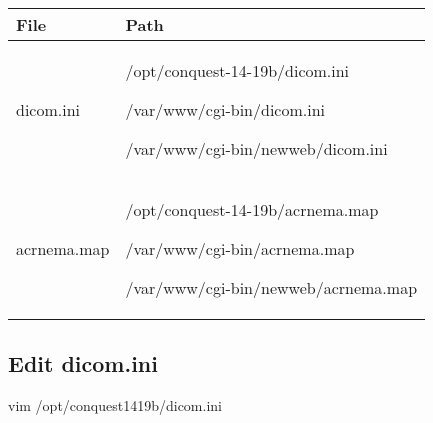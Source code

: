 \documentclass[letterpaper,10pt,english]{sphinxmanual}
\begin{document}
\begin{savenotes}\sphinxattablestart
\centering
\begin{tabulary}{\linewidth}[t]{|T|T|}
\hline
\sphinxstyletheadfamily 
File
&\sphinxstyletheadfamily 
Path
\\
\hline
dicom.ini
&
/opt/conquest-14-19b/dicom.ini

/var/www/cgi-bin/dicom.ini

/var/www/cgi-bin/newweb/dicom.ini
\\
\hline
acrnema.map
&
/opt/conquest-14-19b/acrnema.map

/var/www/cgi-bin/acrnema.map

/var/www/cgi-bin/newweb/acrnema.map
\\
\hline
\end{tabulary}
\par
\sphinxattableend\end{savenotes}


\subsection{Edit dicom.ini}
\label{\detokenize{trl2:edit-dicom-ini}}
%
\begin{sphinxVerbatim}[commandchars=\\\{\}]
vim /opt/conquest\PYGZhy{}14\PYGZhy{}19b/dicom.ini
\end{sphinxVerbatim}
\end{document}
